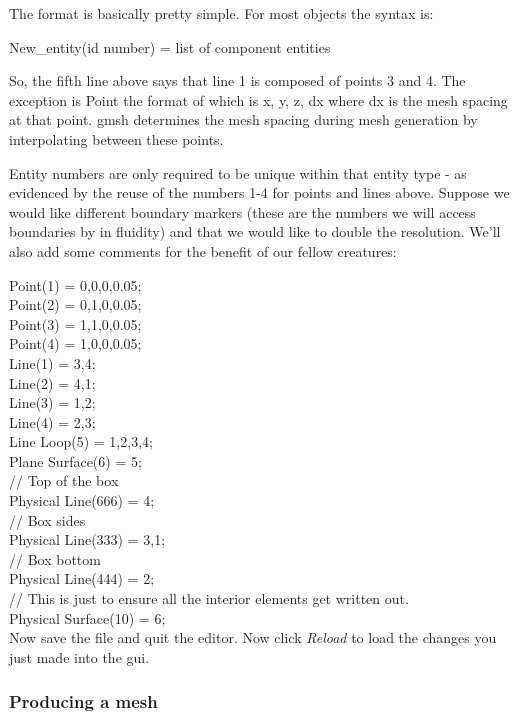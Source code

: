 The format is basically pretty simple. For most objects the syntax is:

 New\_entity(id number) = {list of component entities}

So, the fifth line above says that line 1 is composed of points 3 and 4. The exception is Point the format of which is {x, y, z, dx} where dx is the mesh spacing at that point. gmsh determines the mesh spacing during mesh generation by interpolating between these points.

Entity numbers are only required to be unique within that entity type - as evidenced by the reuse of the numbers 1-4 for points and lines above. Suppose we would like different boundary markers (these are the numbers we will access boundaries by in fluidity) and that we would like to double the resolution. We'll also add some comments for the benefit of our fellow creatures:

 Point(1) = {0,0,0,0.05}; \\
 Point(2) = {0,1,0,0.05}; \\
 Point(3) = {1,1,0,0.05}; \\
 Point(4) = {1,0,0,0.05}; \\
 Line(1) = {3,4};  \\
 Line(2) = {4,1}; \\
 Line(3) = {1,2}; \\
 Line(4) = {2,3}; \\
 Line Loop(5) = {1,2,3,4}; \\
 Plane Surface(6) = {5}; \\
 // Top of the box \\
 Physical Line(666) = {4}; \\
 // Box sides \\
 Physical Line(333) = {3,1}; \\
 // Box bottom \\
 Physical Line(444) = {2}; \\
 // This is just to ensure all the interior elements get written out. \\
 Physical Surface(10) = {6}; \\

Now save the file and quit the editor. Now click \textit{Reload} to load the changes you just made into the gui. 

\subsubsection{Producing a mesh}

